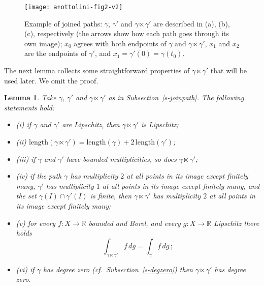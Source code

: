 \documentclass[11pt,reqno,a4paper,final]{amsart}
\numberwithin{equation}{section}
\theoremstyle{mytheorem}
\newtheorem{lemma}[subsection]{Lemma}
\theoremstyle{myremark}
\theoremstyle{myparagraph}
\newenvironment{itemizeb}
{\begin{itemize}\itemsep=2pt\leftskip -5 pt}
{\end{itemize}}
\newcommand{\R}{\mathbb{R}}
\newcommand{\Len}{\mathrm{length}}
\begin{document}
\begin{figure}[h]
\begin{center}
  \texttt{[image: a+ottolini-fig2-v2]}  
  \caption{Example of joined paths: $\gamma$, $\gamma'$ and 
  $\gamma\ltimes\gamma'$ are described in (a), (b), (c), respectively 
  (the arrows show how each path goes through its own image); 
  $x_0$ agrees with both endpoints of $\gamma$ and $\gamma\ltimes\gamma'$,
  $x_1$ and $x_2$ are the endpoints of $\gamma'$, and $x_1=\gamma'(0)=\gamma(t_0)$.} 
  \label{figure2}
\end{center}
\end{figure}

The next lemma collects some straightforward properties 
of $\gamma\ltimes\gamma'$ that will be used later.
We omit the proof.
 

\begin{lemma}
\label{s-joinpathlemma}
Take $\gamma$, $\gamma'$ and $\gamma\ltimes\gamma'$ as in Subsection~\ref{s-joinpath}.
The following statements hold:
%
\begin{itemizeb}
\item[(i)]
if $\gamma$ and $\gamma'$ are Lipschitz, then
$\gamma\ltimes\gamma'$ is Lipschitz;
\item[(ii)]
$\Len(\gamma\ltimes\gamma')=\Len(\gamma)+2\,\Len(\gamma')$;
\item[(iii)]
if $\gamma$ and $\gamma'$ have bounded multiplicities,
so does $\gamma\ltimes\gamma'$;
\item[(iv)]
if the path $\gamma$ has multiplicity $2$ at all points in its image
except finitely many, $\gamma'$ has multiplicity $1$ at all 
points in its image except finitely many, and the set 
$\gamma(I) \cap \gamma'(I)$ is finite, then $\gamma\ltimes\gamma'$ 
has multiplicity $2$ at all points in its image 
except finitely many;
\item[(v)]
for every $f:X\to\R$ bounded and Borel, and every 
$g:X\to\R$ Lipschitz there holds
\[
\int_{\gamma\ltimes\gamma'} f \, dg 
= \int_\gamma f\, dg
\, ;
\] 
\item[(vi)]
if $\gamma$ has degree zero 
(cf.~Subsection~\ref{s-degzero})
then $\gamma\ltimes\gamma'$
has degree zero.
\end{itemizeb}
\end{lemma}
\end{document}

